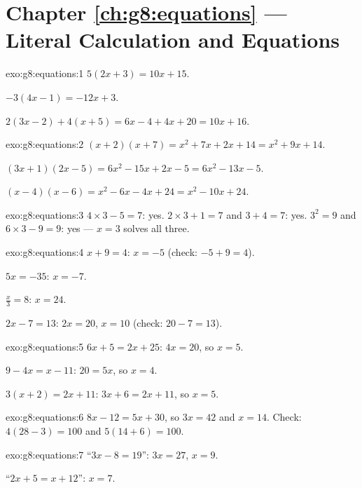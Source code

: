 \section*{Chapter \ref{ch:g8:equations} --- Literal Calculation and Equations}

\begin{solution}{exo:g8:equations:1}
$5(2x + 3) = 10x + 15$.

$-3(4x - 1) = -12x + 3$.

$2(3x - 2) + 4(x + 5) = 6x - 4 + 4x + 20 = 10x + 16$.
\end{solution}

\begin{solution}{exo:g8:equations:2}
$(x+2)(x+7) = x^2 + 7x + 2x + 14 = x^2 + 9x + 14$.

$(3x+1)(2x-5) = 6x^2 - 15x + 2x - 5 = 6x^2 - 13x - 5$.

$(x-4)(x-6) = x^2 - 6x - 4x + 24 = x^2 - 10x + 24$.
\end{solution}

\begin{solution}{exo:g8:equations:3}
$4 \times 3 - 5 = 7$: yes. \quad
$2 \times 3 + 1 = 7$ and $3 + 4 = 7$: yes. \quad
$3^2 = 9$ and $6 \times 3 - 9 = 9$: yes --- $x = 3$ solves all
three.
\end{solution}

\begin{solution}{exo:g8:equations:4}
$x + 9 = 4$: $x = -5$ (check: $-5 + 9 = 4$).

$5x = -35$: $x = -7$.

$\frac x3 = 8$: $x = 24$.

$2x - 7 = 13$: $2x = 20$, $x = 10$ (check: $20 - 7 = 13$).
\end{solution}

\begin{solution}{exo:g8:equations:5}
$6x + 5 = 2x + 25$: $4x = 20$, so $x = 5$.

$9 - 4x = x - 11$: $20 = 5x$, so $x = 4$.

$3(x + 2) = 2x + 11$: $3x + 6 = 2x + 11$, so $x = 5$.
\end{solution}

\begin{solution}{exo:g8:equations:6}
$8x - 12 = 5x + 30$, so $3x = 42$ and $x = 14$. Check:
$4(28 - 3) = 100$ and $5(14 + 6) = 100$.
\end{solution}

\begin{solution}{exo:g8:equations:7}
``$3x - 8 = 19$'': $3x = 27$, $x = 9$.

``$2x + 5 = x + 12$'': $x = 7$.
\end{solution}

